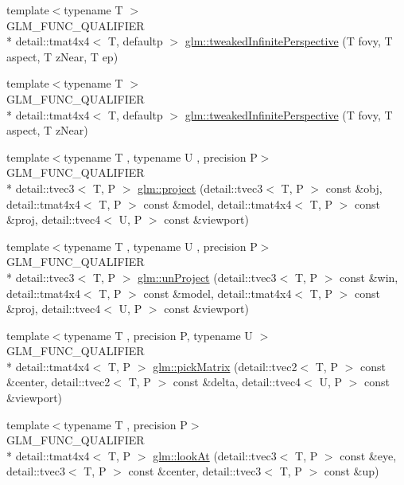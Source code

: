\begin{DoxyCompactItemize}
\item 
{\footnotesize template$<$typename T $>$ }\\G\-L\-M\-\_\-\-F\-U\-N\-C\-\_\-\-Q\-U\-A\-L\-I\-F\-I\-E\-R \\*
detail\-::tmat4x4$<$ T, defaultp $>$ \hyperlink{group__gtc__matrix__transform_gade8abc58c0ac541163e872eb66f3e5de}{glm\-::tweaked\-Infinite\-Perspective} (T fovy, T aspect, T z\-Near, T ep)
\item 
{\footnotesize template$<$typename T $>$ }\\G\-L\-M\-\_\-\-F\-U\-N\-C\-\_\-\-Q\-U\-A\-L\-I\-F\-I\-E\-R \\*
detail\-::tmat4x4$<$ T, defaultp $>$ \hyperlink{group__gtc__matrix__transform_ga9d67732836d71a79dc21eb8f87603cb7}{glm\-::tweaked\-Infinite\-Perspective} (T fovy, T aspect, T z\-Near)
\item 
{\footnotesize template$<$typename T , typename U , precision P$>$ }\\G\-L\-M\-\_\-\-F\-U\-N\-C\-\_\-\-Q\-U\-A\-L\-I\-F\-I\-E\-R \\*
detail\-::tvec3$<$ T, P $>$ \hyperlink{group__gtc__matrix__transform_ga41227b7b98882dcbaa8dab52df372c7b}{glm\-::project} (detail\-::tvec3$<$ T, P $>$ const \&obj, detail\-::tmat4x4$<$ T, P $>$ const \&model, detail\-::tmat4x4$<$ T, P $>$ const \&proj, detail\-::tvec4$<$ U, P $>$ const \&viewport)
\item 
{\footnotesize template$<$typename T , typename U , precision P$>$ }\\G\-L\-M\-\_\-\-F\-U\-N\-C\-\_\-\-Q\-U\-A\-L\-I\-F\-I\-E\-R \\*
detail\-::tvec3$<$ T, P $>$ \hyperlink{group__gtc__matrix__transform_ga4b0a9086d15e2a743ecd7b6128146af1}{glm\-::un\-Project} (detail\-::tvec3$<$ T, P $>$ const \&win, detail\-::tmat4x4$<$ T, P $>$ const \&model, detail\-::tmat4x4$<$ T, P $>$ const \&proj, detail\-::tvec4$<$ U, P $>$ const \&viewport)
\item 
{\footnotesize template$<$typename T , precision P, typename U $>$ }\\G\-L\-M\-\_\-\-F\-U\-N\-C\-\_\-\-Q\-U\-A\-L\-I\-F\-I\-E\-R \\*
detail\-::tmat4x4$<$ T, P $>$ \hyperlink{group__gtc__matrix__transform_ga0fb64f04bf5ad52523fcd4b10b46aff6}{glm\-::pick\-Matrix} (detail\-::tvec2$<$ T, P $>$ const \&center, detail\-::tvec2$<$ T, P $>$ const \&delta, detail\-::tvec4$<$ U, P $>$ const \&viewport)
\item 
{\footnotesize template$<$typename T , precision P$>$ }\\G\-L\-M\-\_\-\-F\-U\-N\-C\-\_\-\-Q\-U\-A\-L\-I\-F\-I\-E\-R \\*
detail\-::tmat4x4$<$ T, P $>$ \hyperlink{group__gtc__matrix__transform_ga454fdf3163c2779eeeeeb9d75907ce97}{glm\-::look\-At} (detail\-::tvec3$<$ T, P $>$ const \&eye, detail\-::tvec3$<$ T, P $>$ const \&center, detail\-::tvec3$<$ T, P $>$ const \&up)
\end{DoxyCompactItemize}


